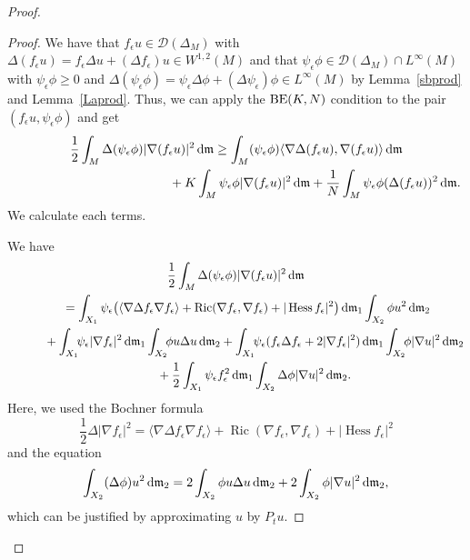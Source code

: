 \documentclass[10pt,a4paper]{amsart}
\numberwithin{equation}{section}
\theoremstyle{definition}
\newcommand{\Ric}{\operatorname{Ric}}
\newcommand{\Hess}{\operatorname{Hess}}
\newcommand{\mf}{\mathfrak{m}}
\newcommand{\BE}{{\rm BE}}
\newcommand{\D}{\mathcal{D}}
\begin{document}
\begin{proof}
\begin{proof}
We have that $f_\epsilon u\in\D(\Delta_M)$ with $\Delta(f_\epsilon u)=f_\epsilon \Delta u+(\Delta f_\epsilon)u\in W^{1,2}(M)$ and that $\psi_\epsilon \phi\in \D(\Delta_M)\cap L^\infty(M)$ with $\psi_\epsilon\phi\geq 0$ and $\Delta(\psi_\epsilon \phi)=\psi_\epsilon \Delta \phi+(\Delta \psi_\epsilon)\phi\in L^\infty (M)$ by Lemma~\ref{sbprod} and Lemma~\ref{Laprod}.
Thus, we can apply the $\BE(K,N)$ condition to the pair $(f_\epsilon u, \psi_\epsilon \phi)$ and get
\begin{gather}
\frac{1}{2}\int_M \Delta(\psi_\epsilon \phi)|\nabla(f_\epsilon u)|^2\,{\rm d}\mf
\geq\int_M (\psi_\epsilon \phi)\langle\nabla \Delta(f_\epsilon u),\nabla(f_\epsilon u) \rangle\,{\rm d}\mf\nonumber
\\ \hphantom{\frac{1}{2}\int_M \Delta(\psi_\epsilon \phi)|\nabla(f_\epsilon u)|^2\,{\rm d}\mf
\geq}
\label{3a}
+K\int_M \psi_\epsilon \phi |\nabla (f_\epsilon u)|^2\,{\rm d}\mf+
\frac{1}{N}\int_M \psi_\epsilon \phi(\Delta(f_\epsilon u))^2\,{\rm d}\mf.
\end{gather}
We calculate each terms.


We have
\begin{gather}
\frac{1}{2}\int_M \Delta(\psi_\epsilon \phi)|\nabla(f_\epsilon u)|^2\,{\rm d}\mf\nonumber
\\ \qquad
=\int_{X_1}\psi_\epsilon\big(\langle\nabla \Delta f_\epsilon\nabla f_\epsilon\rangle+\Ric(\nabla f_\epsilon,\nabla f_\epsilon)+|\Hess f_\epsilon|^2\big)\,{\rm d}\mf_1
\int_{X_2}\phi u^2\,{\rm d}\mf_2\nonumber
\\ \qquad\quad
{}+\int_{X_1}\!\! \psi_\epsilon |\nabla f_\epsilon|^2\,{\rm d}\mf_1\int_{X_2}\!\!\phi u\Delta u\,{\rm d}\mf_2
+\int_{X_1} \!\!\psi_\epsilon (f_\epsilon \Delta f_\epsilon +2|\nabla f_\epsilon|^2)\,{\rm d}\mf_1\int_{X_2}\!\!\phi|\nabla u|^2\,{\rm d}\mf_2
\nonumber
\\ \qquad\quad{}
+\frac{1}{2}\int_{X_1}\psi_\epsilon f_\epsilon^2 \,{\rm d}\mf_1\int_{X_2}\Delta \phi |\nabla u|^2\,{\rm d}\mf_2.
\label{3b}
\end{gather}
Here, we used the Bochner formula
\[\frac{1}{2}\Delta|\nabla f_\epsilon|^2=\langle\nabla \Delta f_\epsilon\nabla f_\epsilon\rangle+\Ric(\nabla f_\epsilon,\nabla f_\epsilon)+|\Hess f_\epsilon|^2\]
and the equation
\[
\int_{X_2} (\Delta \phi )u^2\,{\rm d}\mf_2=2\int_{X_2} \phi u\Delta u\,{\rm d}\mf_2+2\int_{X_2}\phi|\nabla u|^2\,{\rm d}\mf_2,
\]
which can be justified by approximating $u$ by $P_t u$.


\end{proof}
\end{proof}
\end{document}
